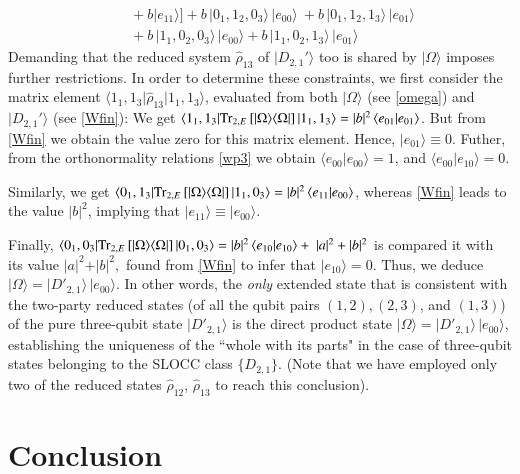 {\begin{align}
&\quad +b\vert e_{11}\rangle]+ b\,  \vert 0_1,1_2,0_3\rangle\,\vert e_{00}\rangle  \ +b\,  \vert 0_1,1_2,1_3\rangle\,\vert e_{01}\rangle\nonumber \\ 
&\quad + b\,  \vert 1_1,0_2,0_3\rangle\,\vert e_{00}\rangle + b\,  \vert 1_1,0_2,1_3\rangle\,\vert e_{01}\rangle\label{omega}
\end{align}
Demanding that the reduced system $\hat{\rho}_{13}$ of $\vert D_{2,1}'\rangle$  too is shared by $\vert \Omega\rangle$ imposes further restrictions. In order to determine these constraints, we first consider the matrix element $\langle 1_1,1_3\vert\hat{\rho}_{13}\vert 1_1,1_3\rangle$, evaluated from both $\vert\Omega\rangle$ (see \eqref{omega}) and $\vert D_{2,1}'\rangle$  (see \eqref{Wfin}): We get $\langle 1_1,1_3\vert{\rm Tr}_{2,E}\, [\vert\Omega\rangle\langle\Omega\vert]\, \vert 1_1,1_3\rangle=\vert b\vert ^2\, \langle e_{01}\vert e_{01}\rangle$. But  from \eqref{Wfin} we obtain  the value zero for this matrix element. Hence, $\vert e_{01}\rangle\equiv 0$. Futher, from the orthonormality relations \eqref{wp3} we obtain $\langle e_{00}\vert e_{00}\rangle=1$, and $\langle e_{00}\vert e_{10}\rangle=0$. 

Similarly, we get $\langle 0_1,1_3\vert{\rm Tr}_{2,E}\, [\vert\Omega\rangle\langle\Omega\vert]\, \vert 1_1,0_3\rangle=\vert b\vert^2\, \langle e_{11}\vert e_{00}\rangle$,  whereas  \eqref{Wfin} leads to the value $\vert b\vert^2$, implying that $\vert e_{11}\rangle\equiv \vert e_{00}\rangle$. 
 
Finally, $\langle 0_1,0_3\vert{\rm Tr}_{2,E}\, [\vert\Omega\rangle\langle\Omega\vert]\, \vert 0_1,0_3\rangle=\vert b\vert^2\, \langle e_{10}\vert e_{10}\rangle+ \ \vert a\vert^2 +\vert b\vert^2$ is  compared it with its value $\vert a\vert^2+\vert b\vert^2,$  found  from \eqref{Wfin} to infer that  $\vert e_{10}\rangle=0$. Thus, we deduce $\vert\Omega\rangle=\vert D'_{2,1}\rangle\, \vert e_{00}\rangle$. In other words, the {\em only} extended state  that is consistent with the two-party reduced states (of all the qubit pairs $(1,2), (2,3)$, and $(1,3)$)  of the pure three-qubit state $\vert D'_{2,1}\rangle$ is the direct product state $\vert\Omega\rangle=\vert D'_{2,1}\rangle\, \vert e_{00}\rangle$,  establishing  the uniqueness of the ``whole with its parts" in the case of three-qubit states belonging to the SLOCC class $\{D_{2,1}\}$. (Note that we have employed only two  of the reduced states $\hat{\rho}_{12}$, $\hat{\rho}_{13}$ to reach this conclusion).

\section{Conclusion}

}
